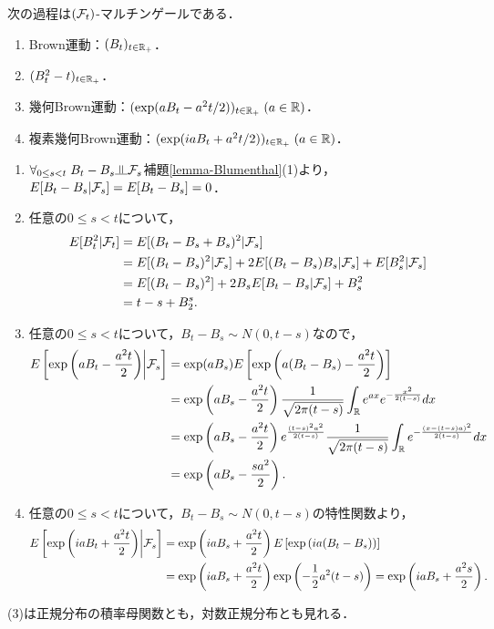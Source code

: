 \documentclass[uplatex,dvipdfmx]{jsreport}
\begin{document}
\begin{theorem}
    次の過程は$(\mathcal{F}_t)$-マルチンゲールである．
    \begin{enumerate}
        \item Brown運動：$(B_t)_{t\in\mathbb{R}_+}$．
        \item $(B^2_t-t)_{t\in\mathbb{R}_+}$．
        \item 幾何Brown運動：$(\exp(aB_t-a^2t/2))_{t\in\mathbb{R}_+}\;(a\in\mathbb{R})$．
        \item 複素幾何Brown運動：$(\exp(iaB_t+a^2t/2))_{t\in\mathbb{R}_+}\;(a\in\mathbb{R})$．
    \end{enumerate}
\end{theorem}
\begin{Proof}\mbox{}
    \begin{enumerate}
        \item $\forall_{0\le s<t}\;B_t-B_s\indep\F_s$補題\ref{lemma-Blumenthal}(1)より，$E[B_t-B_s|\mathcal{F}_s]=E[B_t-B_s]=0$．
        \item 任意の$0\le s<t$について，
        \begin{align*}
            E[B^2_t|\mathcal{F}_t]&=E[(B_t-B_s+B_s)^2|\mathcal{F}_s]\\
            &=E[(B_t-B_s)^2|\mathcal{F}_s]+2E[(B_t-B_s)B_s|\mathcal{F}_s]+E[B^2_s|\mathcal{F}_s]\\
            &=E[(B_t-B_s)^2]+2B_sE[B_t-B_s|\mathcal{F}_s]+B^2_s\\
            &=t-s+B_2^s.
        \end{align*}
        \item 任意の$0\le s<t$について，$B_t-B_s\sim N(0,t-s)$なので，
        \begin{align*}
            E\left[\exp\left(aB_t-\frac{a^2t}{2}\right)\middle|\mathcal{F}_s\right]&=\exp(aB_s)E\left[\exp\left(a(B_t-B_s)-\frac{a^2t}{2}\right)\right]\\
            &=\exp\left(aB_s-\frac{a^2t}{2}\right)\frac{1}{\sqrt{2\pi(t-s)}}\int_{\mathbb{R}} e^{ax}e^{-\frac{x^2}{2(t-s)}}dx\\
            &=\exp\left(aB_s-\frac{a^2t}{2}\right)e^{\frac{(t-s)^2a^2}{2(t-s)}}\frac{1}{\sqrt{2\pi(t-s)}}\int_{\mathbb{R}} e^{-\frac{(x-(t-s)a)^2}{2(t-s)}}dx\\
            &=\exp\left(aB_s-\frac{sa^2}{2}\right).
        \end{align*}
        \item 任意の$0\le s<t$について，$B_t-B_s\sim N(0,t-s)$の特性関数より，
        \begin{align*}
            E\left[\exp\left(iaB_t+\frac{a^2t}{2}\right)\middle|\mathcal{F}_s\right]&=\exp\left(iaB_s+\frac{a^2t}{2}\right)E\left[\exp\left(ia(B_t-B_s)\right)\right]\\
            &=\exp\left(iaB_s+\frac{a^2t}{2}\right)\exp\left(-\frac{1}{2}a^2(t-s)\right)=\exp\left(iaB_s+\frac{a^2s}{2}\right).
        \end{align*}
    \end{enumerate}
\end{Proof}
\begin{remarks}
    (3)は正規分布の積率母関数とも，対数正規分布とも見れる．
\end{remarks}
\end{document}

